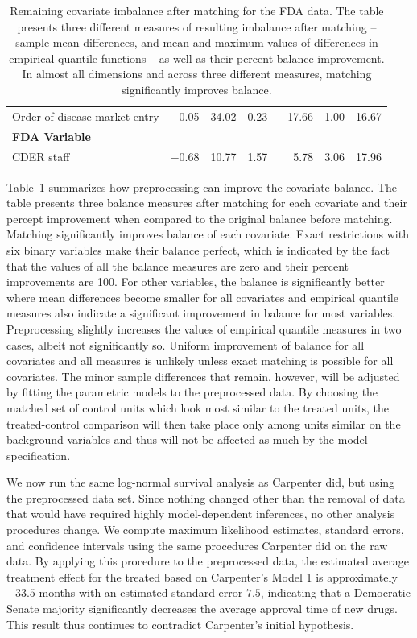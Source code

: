 \documentclass[11pt,titlepage]{article}
\begin{document}
\begin{table}[t]
\begin{center}
\begin{tabular}{lrrrrrr}
Order of disease market entry & 0.05 & 34.02 & 0.23 & $-$17.66 & 1.00 & 16.67 \\
{\bf FDA Variable} & \\
CDER staff & $-$0.68 & 10.77 & 1.57 & 5.78 & 3.06 & 17.96 \\
\hline
\hline
\end{tabular}
\end{center}
\caption{Remaining covariate imbalance after matching for the FDA data. 
  The table presents three different measures of resulting imbalance
  after matching -- sample mean differences, and mean and maximum
  values of differences in empirical quantile functions -- as well as
  their percent balance improvement. In almost all dimensions and
  across three different measures, matching significantly improves
  balance.   
} \label{tb:fdabal}
\end{table}

Table~\ref{tb:fdabal} summarizes how preprocessing can improve the
covariate balance. The table presents three balance measures after
matching for each covariate and their percept improvement when
compared to the original balance before matching.  Matching
significantly improves balance of each covariate. Exact restrictions
with six binary variables make their balance perfect, which is
indicated by the fact that the values of all the balance measures are
zero and their percent improvements are 100. For other variables, the
balance is significantly better where mean differences become smaller
for all covariates and empirical quantile measures also indicate a
significant improvement in balance for most variables.  Preprocessing
slightly increases the values of empirical quantile measures in two
cases, albeit not significantly so.  Uniform improvement of balance
for all covariates and all measures is unlikely unless exact matching
is possible for all covariates. The minor sample differences that
remain, however, will be adjusted by fitting the parametric models to
the preprocessed data. By choosing the matched set of control units
which look most similar to the treated units, the treated-control
comparison will then take place only among units similar on the
background variables and thus will not be affected as much by the
model specification.

We now run the same log-normal survival analysis as Carpenter did, but
using the preprocessed data set.  Since nothing changed other than the
removal of data that would have required highly model-dependent
inferences, no other analysis procedures change.  We compute maximum
likelihood estimates, standard errors, and confidence intervals using
the same procedures Carpenter did on the raw data.  By applying this
procedure to the preprocessed data, the estimated average treatment
effect for the treated based on Carpenter's Model 1 is approximately
$-33.5$ months with an estimated standard error $7.5$, indicating that
a Democratic Senate majority significantly decreases the average
approval time of new drugs.  This result thus continues to contradict
Carpenter's initial hypothesis.
\end{document}
